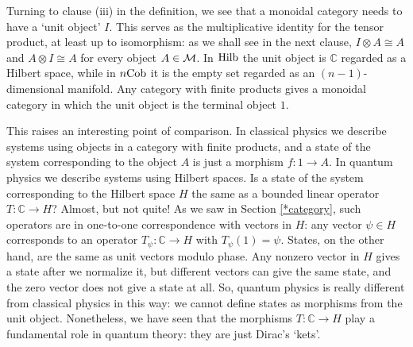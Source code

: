 \documentclass[12pt]{article}
\newcommand{\Hilb}{{\rm Hilb}}
\newcommand{\Cob}{{\rm Cob}}
\newcommand{\C}{{\mathbb C}}
\newcommand{\M}{{\cal M}}
\renewcommand{\to}{\rightarrow}
\newcommand{\maps}{\colon}
\newcommand{\tensor}{\otimes}
\newcommand{\iso}{\cong}
\begin{document}
Turning to clause (iii) in the definition, we see that a monoidal
category needs to have a `unit object' $I$.  This serves as the
multiplicative identity for the tensor product, at least up to
isomorphism: as we shall see in the next clause, $I \tensor A \cong A$
and $A \tensor I \iso A$ for every object $A \in \M$.  In $\Hilb$ the
unit object is $\C$ regarded as a Hilbert space, while in $n\Cob$ it
is the empty set regarded as an $(n-1)$-dimensional manifold.  Any
category with finite products gives a monoidal category in which the
unit object is the terminal object $1$.

This raises an interesting point of comparison.  In classical physics 
we describe systems using objects in a category with finite products, 
and a state of the system corresponding to the object $A$ is just a 
morphism $f \maps 1 \to A$.  In quantum physics we describe systems 
using Hilbert spaces.  Is a state of the system corresponding to the 
Hilbert space $H$ the same as a bounded linear operator $T \maps
\C \to H$?  Almost, but not quite!  As we saw in Section \ref{*category},
such operators are in one-to-one correspondence with vectors in $H$: 
any vector $\psi \in H$ corresponds to an operator $T_\psi \maps \C \to H$ 
with $T_\psi(1) = \psi$.  States, on the other hand, are the same as
unit vectors modulo phase.  Any nonzero vector in $H$ gives a state
after we normalize it, but different vectors can give the same state,
and the zero vector does not give a state at all.  So, quantum physics 
is really different from classical physics in this way: we cannot 
define states as morphisms from the unit object.  Nonetheless, we
have seen that the morphisms $T \maps \C \to H$ play a fundamental 
role in quantum theory: they are just Dirac's `kets'.
\end{document}
